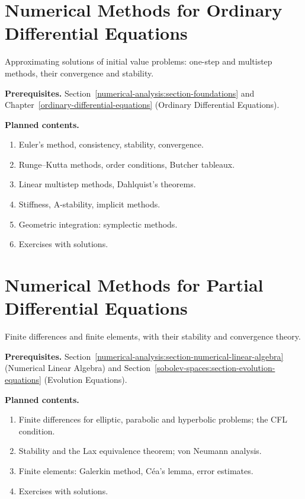 \section{Numerical Methods for Ordinary Differential Equations}\label{numerical-analysis:section-numerical-ode}
Approximating solutions of initial value problems: one-step and multistep methods, their convergence
and stability.

\noindent\textbf{Prerequisites.} Section~\ref{numerical-analysis:section-foundations} and Chapter~\ref{ordinary-differential-equations} (Ordinary Differential Equations).

\noindent\textbf{Planned contents.}
\begin{enumerate}
\item Euler's method, consistency, stability, convergence.
\item Runge--Kutta methods, order conditions, Butcher tableaux.
\item Linear multistep methods, Dahlquist's theorems.
\item Stiffness, A-stability, implicit methods.
\item Geometric integration: symplectic methods.
\item Exercises with solutions.
\end{enumerate}

\section{Numerical Methods for Partial Differential Equations}\label{numerical-analysis:section-numerical-pde}
Finite differences and finite elements, with their stability and convergence theory.

\noindent\textbf{Prerequisites.} Section~\ref{numerical-analysis:section-numerical-linear-algebra} (Numerical Linear Algebra) and Section~\ref{sobolev-spaces:section-evolution-equations} (Evolution Equations).

\noindent\textbf{Planned contents.}
\begin{enumerate}
\item Finite differences for elliptic, parabolic and hyperbolic problems; the CFL condition.
\item Stability and the Lax equivalence theorem; von Neumann analysis.
\item Finite elements: Galerkin method, C\'ea's lemma, error estimates.
\item Exercises with solutions.
\end{enumerate}
